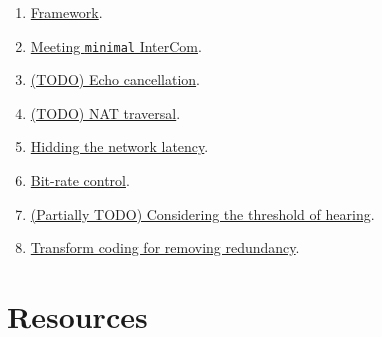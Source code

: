 \begin{enumerate}
\item \href{https://tecnologias-multimedia.github.io/study_guide/framework/}{Framework}. %
\item \href{https://tecnologias-multimedia.github.io/study_guide/minimal/}{Meeting \texttt{minimal} InterCom}. %
\item \href{https://tecnologias-multimedia.github.io/study_guide/echo_cancellation/}{(TODO) Echo cancellation}.
\item \href{https://tecnologias-multimedia.github.io/study_guide/NAT_traversal/}{(TODO) NAT traversal}. %
\item \href{https://tecnologias-multimedia.github.io/study_guide/latency/}{Hidding the network latency}. %
\item \href{https://tecnologias-multimedia.github.io/study_guide/BR_control/}{Bit-rate control}. %
\item \href{https://tecnologias-multimedia.github.io/study_guide/threshold_of_hearing/}{(Partially TODO) Considering the threshold of hearing}.
\item \href{https://tecnologias-multimedia.github.io/study_guide/transform_coding/}{Transform coding for removing redundancy}.
\end{enumerate}

\section{Resources}


